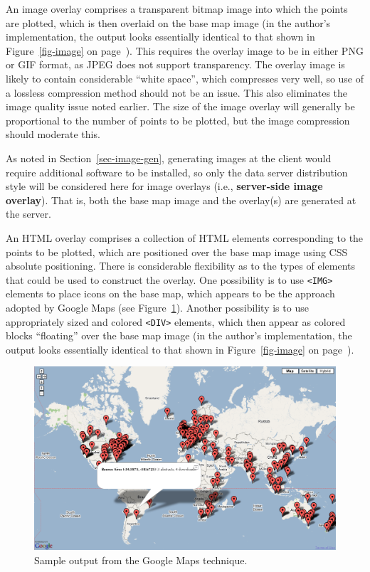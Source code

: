 \documentclass[acmnow]{acmtrans2m}
\begin{document}
An image overlay comprises a transparent bitmap image into which the
points are plotted, which is then overlaid on the base map image (in the
author's implementation, the output looks essentially identical to that
shown in Figure~\ref{fig-image} on page~\pageref{fig-image}). This
requires the overlay image to be in either PNG or GIF format, as JPEG
does not support transparency. The overlay image is likely to contain
considerable ``white space'', which compresses very well, so use of a
lossless compression method should not be an issue. This also eliminates
the image quality issue noted earlier. The size of the image overlay
will generally be proportional to the number of points to be plotted,
but the image compression should moderate this.

As noted in Section~\ref{sec-image-gen}, generating images at the client
would require additional software to be installed, so only the data
server distribution style will be considered here for image overlays
(i.e., \textbf{server-side image overlay}). That is, both the base map
image and the overlay(s) are generated at the server.

An HTML overlay comprises a collection of HTML elements corresponding to
the points to be plotted, which are positioned over the base map image
using CSS absolute positioning. There is considerable flexibility as to
the types of elements that could be used to construct the overlay. One
possibility is to use \verb|<IMG>| elements to place icons on the base
map, which appears to be the approach adopted by Google Maps (see
Figure~\ref{fig-google}). Another possibility is to use appropriately
sized and colored \verb|<DIV>| elements, which then appear as colored
blocks ``floating'' over the base map image (in the author's
implementation, the output looks essentially identical to that shown in
Figure~\ref{fig-image} on page~\pageref{fig-image}).


\begin{figure}
	\centering
	\includegraphics[width=\textwidth,keepaspectratio]{GoogleMap-full.png}
	\caption{Sample output from the Google Maps technique.}
	\label{fig-google}
\end{figure}
\end{document}
